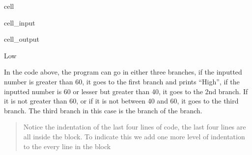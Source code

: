 \documentclass[letterpaper,10pt,english]{jupyterBook}
\begin{document}
\begin{sphinxuseclass}{cell}\begin{sphinxVerbatimInput}

\begin{sphinxuseclass}{cell_input}
\begin{sphinxVerbatim}[commandchars=\\\{\}]
  
   
          
\end{sphinxVerbatim}

\end{sphinxuseclass}\end{sphinxVerbatimInput}
\begin{sphinxVerbatimOutput}

\begin{sphinxuseclass}{cell_output}
\begin{sphinxVerbatim}[commandchars=\\\{\}]
Low
\end{sphinxVerbatim}

\end{sphinxuseclass}\end{sphinxVerbatimOutput}

\end{sphinxuseclass}
\sphinxAtStartPar
In the code above, the program can go in either three branches, if the inputted number is greater than 60, it goes to the first branch and prints “High”, if the inputted number is 60 or lesser but greater than 40, it goes to the 2nd branch. If it is not greater than 60, or if it is not between 40 and 60, it goes to the third branch. The third branch in this case is the  branch of the  branch.
\begin{quote}

\sphinxAtStartPar
Notice the indentation of the last four lines of code, the last four lines are all inside the  block. To indicate this we add one more level of indentation to the every line in the block
\end{quote}
\end{document}

